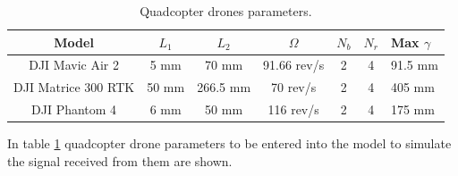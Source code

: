 \begin{table}[h!]
\centering
\begin{tabular}{|c|c|c|c|c|c|l|}
\hline
{\color[HTML]{000000} Model} & {\color[HTML]{000000} $L_1$} & {\color[HTML]{000000} $L_2$} & {\color[HTML]{000000} $\Omega$} & {\color[HTML]{000000} $N_b$} & {\color[HTML]{000000} $N_r$} & Max $\gamma$ \\ \hline
{\color[HTML]{000000} DJI Mavic Air 2} & {\color[HTML]{000000} 5 mm} & {\color[HTML]{000000} 70 mm} & {\color[HTML]{000000} 91.66 rev/s} & {\color[HTML]{000000} 2} & {\color[HTML]{000000} 4} & 91.5 mm \\ \hline
{\color[HTML]{000000} DJI Matrice 300 RTK} & {\color[HTML]{000000} 50 mm} & {\color[HTML]{000000} 266.5 mm} & {\color[HTML]{000000} 70  rev/s} & {\color[HTML]{000000} 2} & {\color[HTML]{000000} 4} & 405 mm \\ \hline
{\color[HTML]{000000} DJI Phantom 4} & {\color[HTML]{000000} 6 mm} & {\color[HTML]{000000} 50 mm} & {\color[HTML]{000000} 116 rev/s} & {\color[HTML]{000000} 2} & {\color[HTML]{000000} 4} & 175 mm \\ \hline
\end{tabular}
\caption{Quadcopter drones parameters.\cite{MartinMulgrew} }
\label{tab:quadcoptersparams}
\end{table}
In table \ref{tab:quadcoptersparams} quadcopter drone parameters to be entered into the model to simulate the signal received from them are shown.

